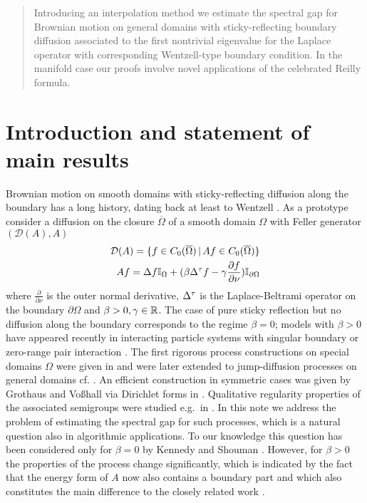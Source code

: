 \documentclass[a4paper]{article}
\theoremstyle{definition}
\numberwithin{equation}{section}
\begin{document}
\begin{abstract} Introducing  an interpolation method we estimate the spectral gap for Brownian motion on general domains with sticky-reflecting boundary diffusion associated to the first nontrivial eigenvalue for the Laplace operator with corresponding Wentzell-type boundary condition. In the manifold case our proofs involve  novel applications of the celebrated Reilly formula. \end{abstract}


\section{Introduction and statement of main results}
Brownian motion on smooth domains with sticky-reflecting  diffusion along the boundary has a long history, dating back at least to  Wentzell \cite{MR121855}. As a  prototype consider a diffusion on the closure $\overline \Omega$ of a  smooth domain $ \Omega$ with Feller generator $(\mathcal D(A), A)$ 
\begin{equation}
\label{eq:gendef}
    \begin{aligned} \mathcal D(A) =  \{ f \in C_0(\overline \Omega) \, | \, Af \in C_0(\overline \Omega) \} \\
 A f =  \Delta f \mathbb I_{\Omega} + ( \beta  \Delta^\tau f - \gamma \frac {\partial f}{\partial \nu })\mathbb I_{\partial \Omega} \end{aligned}
 \end{equation}
where 
$\frac{\partial}{\partial \nu}$ is the outer normal derivative, $\Delta^\tau$ is the Laplace-Beltrami operator on the boundary $\partial \Omega$ and $\beta >0, \gamma \in \mathbb{R}$. The case of pure sticky reflection but no diffusion along the boundary corresponds to the regime $\beta =0$; models with $\beta >0$ have appeared recently in
interacting particle systems with singular boundary or zero-range pair interaction \cite{MR4096131,MR2198199,MR2215623,konarovskyi2017reversible,nonnenmacher2018overdamped}.  The first rigorous process constructions on special domains  $\Omega$ were given in  \cite{MR126883,MR929208,MR287612} and were later extended to jump-diffusion processes  on general domains   \cite{MR245085} cf. \cite{MR4176673}. An efficient construction in symmetric cases 
was given by Grothaus and Vo\ss{}hall via Dirichlet forms in \cite{grothaus}. Qualitative regularity properties of the associated semigroups were studied  e.g.\ in \cite{MR4065110}. In this note we address the problem of estimating the spectral gap for such processes, which is a natural question also in algorithmic applications. To our knowledge this question has been considered only for  $\beta=0$ by Kennedy \cite{MR2448584} and Shouman \cite{MR3951758}. However, for $\beta >0$ the properties of the process change significantly,  which is indicated by the fact that the energy form of $A$ now also contains a boundary part and which also constitutes the main difference to the closely related work  \cite{kolesnikov}.
\end{document}
